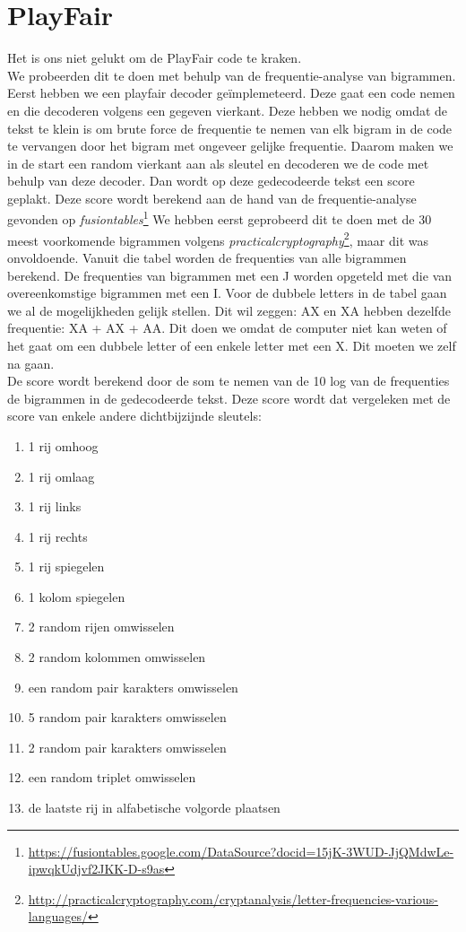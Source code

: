 \documentclass[fleqn]{article}
\begin{document}
	
	
	\section{PlayFair}
	Het is ons niet gelukt om de PlayFair code te kraken.\\
	We probeerden dit te doen met behulp van de frequentie-analyse van bigrammen. Eerst hebben we een playfair decoder ge\"{i}mplemeteerd. Deze gaat een code nemen en die decoderen volgens een gegeven vierkant. Deze hebben we nodig omdat de tekst te klein is om brute force de frequentie te nemen van elk bigram in de code te vervangen door het bigram met ongeveer gelijke frequentie. Daarom maken we in de start een random vierkant aan als sleutel en decoderen we de code met behulp van deze decoder. Dan wordt op deze gedecodeerde tekst een score geplakt. Deze score wordt berekend aan de hand van de frequentie-analyse gevonden op \textit{fusiontables}\footnote{\url{https://fusiontables.google.com/DataSource?docid=15jK-3WUD-JjQMdwLe-ipwqkUdjvf2JKK-D-s9as}} We hebben eerst geprobeerd dit te doen met de 30 meest voorkomende bigrammen volgens \textit{practicalcryptography}\footnote{\url{http://practicalcryptography.com/cryptanalysis/letter-frequencies-various-languages/}}, maar dit was onvoldoende.
	Vanuit die tabel worden de frequenties van alle bigrammen berekend. De frequenties van bigrammen met een J worden opgeteld met die van overeenkomstige bigrammen met een I. Voor de dubbele letters in de tabel gaan we al de mogelijkheden gelijk stellen. Dit wil zeggen: AX en XA hebben dezelfde frequentie: XA + AX + AA. Dit doen we omdat de computer niet kan weten of het gaat om een dubbele letter of een enkele letter met een X. Dit moeten we zelf na gaan.\\
	De score wordt berekend door de som te nemen van de 10 log van de frequenties de bigrammen in de gedecodeerde tekst.
	Deze score wordt dat vergeleken met de score van enkele andere dichtbijzijnde sleutels:
	\begin{enumerate}
		\item 1 rij omhoog
		\item 1 rij omlaag
		\item 1 rij links
		\item 1 rij rechts
		\item 1 rij spiegelen
		\item 1 kolom spiegelen
		\item 2 random rijen omwisselen
		\item 2 random kolommen omwisselen
		\item een random pair karakters omwisselen
		\item 5 random pair karakters omwisselen
		\item 2 random pair karakters omwisselen
		\item een random triplet omwisselen
		\item de laatste rij in alfabetische volgorde plaatsen
	\end{enumerate}
\end{document}

